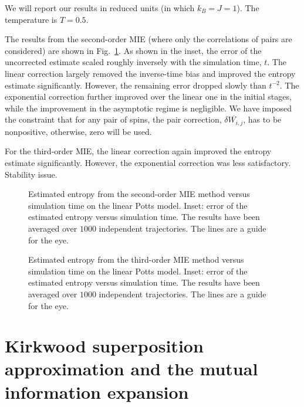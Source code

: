\documentclass[reprint, superscriptaddress]{revtex4-1}
\begin{document}
We will report our results in reduced units (in which $k_B = J = 1$).
%
The temperature is $T = 0.5$.

The results from the second-order MIE
(where only the correlations of pairs are considered)
are shown in Fig.~\ref{fig:potts_mie2nd}.
%
As shown in the inset, the error of the uncorrected estimate
scaled roughly inversely with the simulation time, $t$.
%
The linear correction largely removed the inverse-time bias
and improved the entropy estimate significantly.
%
However, the remaining error dropped slowly than $t^{-2}$.
%
The exponential correction further improved over
the linear one in the initial stages,
while the improvement in the asymptotic regime is negligible.
%
We have imposed the constraint that
for any pair of spins,
the pair correction, $\overline{ \delta W_{i, j} }$,
has to be nonpositive,
otherwise, zero will be used.

For the third-order MIE,
the linear correction again improved the entropy estimate
significantly.
However, the exponential correction was less satisfactory.
Stability issue.

\begin{figure}[h]\centering
  \caption{
    \label{fig:potts_mie2nd}
    Estimated entropy from the second-order MIE method
    versus simulation time on the linear Potts model.
    Inset: error of the estimated entropy
    versus simulation time.
    The results have been averaged over $1000$ independent trajectories.
    The lines are a guide for the eye.
  }
\end{figure}

\begin{figure}[h]\centering
  \caption{
    \label{fig:potts_mie3rd}
    Estimated entropy from the third-order MIE method
    versus simulation time on the linear Potts model.
    Inset: error of the estimated entropy
    versus simulation time.
    The results have been averaged over $1000$ independent trajectories.
    The lines are a guide for the eye.
  }
\end{figure}


\appendix

\section{\label{sec:Kirkwood}
Kirkwood superposition approximation and the mutual information expansion}
\end{document}
